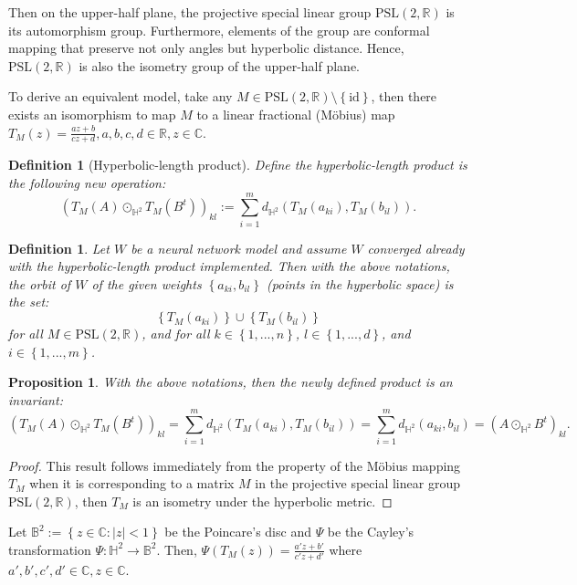 \documentclass{article}
\theoremstyle{plain}
\theoremstyle{plain} %
\newtheorem{proposition}{Proposition}
\newtheorem{definition}[theorem]{Definition}
\theoremstyle{definition}  %
\theoremstyle{remark}  %
\theoremstyle{plain}
\begin{document}
Then on the upper-half plane, the projective special linear group $\text{PSL}(2,\mathbb{R})$ is its automorphism group. Furthermore, elements of the group are conformal mapping that preserve not only angles but hyperbolic distance. Hence, $\text{PSL}(2,\mathbb{R})$ is also the isometry group of the upper-half plane.


To derive an equivalent model, take any $M\in \text{PSL}(2,\mathbb{R})\setminus\left\lbrace \text{id}\right\rbrace$, then there exists an isomorphism to map $M$ to a linear fractional (M\"{o}bius) map $T_M(z)=\frac{az+b}{cz+d}, a,b,c,d\in\mathbb{R},z\in\mathbb{C}$.
\begin{definition}[Hyperbolic-length product]
Define \textit{the hyperbolic-length product} is the following new operation:
$$
\left( T_M(A) \odot_{\mathbb{H}^2} T_M(B^t)\right)_{kl} := \sum\limits_{i=1}^m d_{\mathbb{H}^2} \left(T_M \left( a_{ki} \right) ,T_M\left( b_{il}\right) \right).
$$
\end{definition}
\begin{definition}
Let $W$ be a neural network model and assume $W$ converged already with the hyperbolic-length product implemented. Then with the above notations, the orbit of $W$ of the given weights $\left\lbrace a_{ki},  b_{il}\right\rbrace$ (points in the hyperbolic space) is the set:
$$
\left\lbrace T_M(a_{ki}) \right\rbrace \cup \left\lbrace T_M(b_{il}) \right\rbrace
$$
for all $M\in \text{PSL}(2,\mathbb{R})$, and for all $k\in\left\lbrace 1,...,n\right\rbrace$, $l\in\left\lbrace 1,...,d\right\rbrace$, and $i\in\left\lbrace 1,...,m\right\rbrace$.
\end{definition}
\begin{proposition}
With the above notations, then the newly defined product is an invariant:
$$
\left( T_M(A) \odot_{\mathbb{H}^2} T_M(B^t)\right)_{kl} = \sum\limits_{i=1}^m d_{\mathbb{H}^2} \left(T_M \left( a_{ki} \right) ,T_M\left( b_{il}\right) \right)
=  \sum\limits_{i=1}^m d_{\mathbb{H}^2} \left( a_{ki}  , b_{il} \right)  =\left( A\odot_{\mathbb{H}^2} B^t\right)_{kl}.$$
\end{proposition}
\begin{proof}
This result follows immediately from the property of the M\"{o}bius mapping $T_M$ when it is corresponding to a matrix $M$ in the projective special linear group $\text{PSL}(2,\mathbb{R})$, then $T_M$ is an isometry under the hyperbolic metric.
\end{proof}
Let $\mathbb{B}^2:=\left\lbrace z\in\mathbb{C} : \vert z \vert <1\right\rbrace$ be the Poincare's disc and $\Psi$ be the Cayley's transformation $\Psi: \mathbb{H}^2 \to \mathbb{B}^2$. Then, $\Psi\left( T_M(z)\right)=\frac{a'z+b'}{c'z+d'}$ where $a',b',c',d'\in\mathbb{C},z\in\mathbb{C}$.
\end{document}
